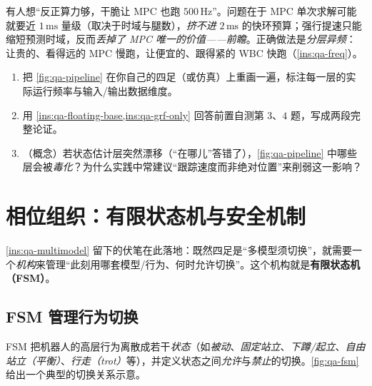 \begin{pitfall}[误区：把所有环都拉到同一高频]
有人想“反正算力够，干脆让 MPC 也跑 $500\,\mathrm{Hz}$”。问题在于 MPC 单次求解可能就要近 $1\,\mathrm{ms}$ 量级（取决于时域与腿数），\emph{挤不进} $2\,\mathrm{ms}$ 的快环预算；强行提速只能缩短预测时域，反而\emph{丢掉了 MPC 唯一的价值——前瞻}。正确做法是\emph{分层异频}：让贵的、看得远的 MPC 慢跑，让便宜的、跟得紧的 WBC 快跑（\cref{ins:qa-freq}）。
\end{pitfall}

\begin{practice}
\begin{enumerate}
  \item 把 \cref{fig:qa-pipeline} 在你自己的四足（或仿真）上重画一遍，标注每一层的实际运行频率与输入/输出数据维度。
  \item 用 \cref{ins:qa-floating-base,ins:qa-grf-only} 回答前置自测第 $3$、$4$ 题，写成两段完整论证。
  \item （概念）若状态估计层突然漂移（“在哪儿”答错了），\cref{fig:qa-pipeline} 中哪些层会被\emph{毒化}？为什么实践中常建议“跟踪速度而非绝对位置”来削弱这一影响？
\end{enumerate}
\end{practice}

\section{相位组织：有限状态机与安全机制}
\label{sec:qa-fsm}

\cref{ins:qa-multimodel} 留下的伏笔在此落地：既然四足是“多模型须切换”，就需要一个\emph{机构}来管理“此刻用哪套模型/行为、何时允许切换”。这个机构就是\textbf{有限状态机（FSM）}\cite{yu2021quadruped}。

\subsection{FSM 管理行为切换}
\label{subsec:qa-fsm-states}

FSM 把机器人的高层行为离散成若干\emph{状态}（如\emph{被动}、\emph{固定站立}、\emph{下蹲/起立}、\emph{自由站立（平衡）}、\emph{行走（trot）}等），并定义状态之间\emph{允许}与\emph{禁止}的切换。\cref{fig:qa-fsm} 给出一个典型的切换关系示意。

